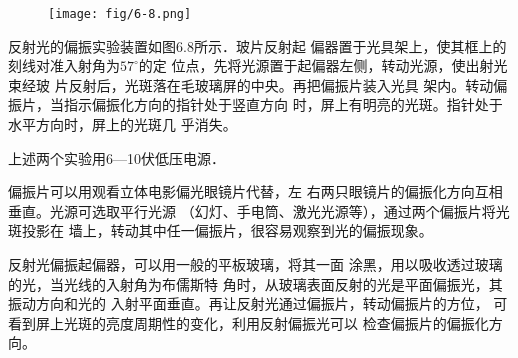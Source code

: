 \begin{figure}[htp]
    \centering
    \texttt{[image: fig/6-8.png]}
    \caption{}
\end{figure}

反射光的偏振实验装置如图6.8所示．玻片反射起
偏器置于光具架上，使其框上的刻线对准入射角为$57^{\circ}$的定
位点，先将光源置于起偏器左侧，转动光源，使出射光束经玻
片反射后，光斑落在毛玻璃屏的中央。再把偏振片装入光具
架内。转动偏振片，当指示偏振化方向的指针处于竖直方向
时，屏上有明亮的光斑。指针处于水平方向时，屏上的光斑几
乎消失。

上述两个实验用6—10伏低压电源．

偏振片可以用观看立体电影偏光眼镜片代替，左
右两只眼镜片的偏振化方向互相垂直。光源可选取平行光源
（幻灯、手电筒、激光光源等），通过两个偏振片将光斑投影在
墙上，转动其中任一偏振片，很容易观察到光的偏振现象。

反射光偏振起偏器，可以用一般的平板玻璃，将其一面
涂黑，用以吸收透过玻璃的光，当光线的入射角为布儒斯特
角时，从玻璃表面反射的光是平面偏振光，其振动方向和光的
入射平面垂直。再让反射光通过偏振片，转动偏振片的方位，
可看到屏上光斑的亮度周期性的变化，利用反射偏振光可以
检查偏振片的偏振化方向。





















































